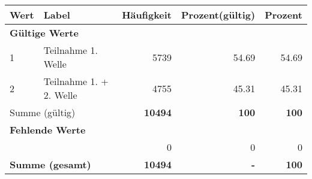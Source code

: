      \begin{longtable}{lXrrr}
     \toprule
     \textbf{Wert} & \textbf{Label} & \textbf{Häufigkeit} & \textbf{Prozent(gültig)} & \textbf{Prozent} \\
     \endhead
     \midrule
     \multicolumn{5}{l}{\textbf{Gültige Werte}}\\

     1 &
     \multicolumn{1}{X}{ Teilnahme 1. Welle   } &


       \num{5739} &
       \num[round-mode=places,round-precision=2]{54,69} &
         \num[round-mode=places,round-precision=2]{54,69} \\

     2 &
     \multicolumn{1}{X}{ Teilnahme 1. + 2. Welle   } &


       \num{4755} &
       \num[round-mode=places,round-precision=2]{45,31} &
         \num[round-mode=places,round-precision=2]{45,31} \\
     \midrule
     \multicolumn{2}{l}{Summe (gültig)} &
       \textbf{\num{10494}} &
     \textbf{100} &
       \textbf{\num[round-mode=places,round-precision=2]{100}} \\
     \multicolumn{5}{l}{\textbf{Fehlende Werte}}\\
      & & 0 & 0 & 0 \\
     \midrule
     \multicolumn{2}{l}{\textbf{Summe (gesamt)}} &
          \textbf{\num{10494}} &
        \textbf{-} &
        \textbf{100} \\
     \bottomrule
     \end{longtable}
     
